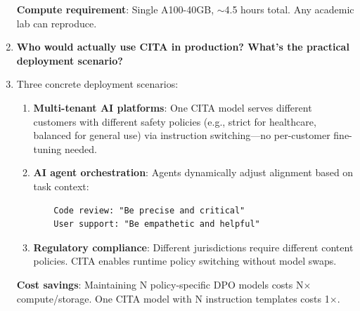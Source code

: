 \begin{enumerate}[label=\textbf{Q\arabic*.}, leftmargin=*, itemsep=8pt]
\textbf{Compute requirement}: Single A100-40GB, $\sim$4.5 hours total. Any academic lab can reproduce.

\vspace{4mm}

\item[\ding{93}] \textbf{Who would actually use CITA in production? What's the practical deployment scenario?}

\item[\ding{224}] Three concrete deployment scenarios:

\begin{enumerate}[leftmargin=*,itemsep=2pt]
    \item \textbf{Multi-tenant AI platforms}: One CITA model serves different customers with different safety policies (e.g., strict for healthcare, balanced for general use) via instruction switching---no per-customer fine-tuning needed.

    \item \textbf{AI agent orchestration}: Agents dynamically adjust alignment based on task context:
    \begin{verbatim}
    Code review: "Be precise and critical"
    User support: "Be empathetic and helpful"
    \end{verbatim}

    \item \textbf{Regulatory compliance}: Different jurisdictions require different content policies. CITA enables runtime policy switching without model swaps.
\end{enumerate}

\textbf{Cost savings}: Maintaining N policy-specific DPO models costs N$\times$ compute/storage. One CITA model with N instruction templates costs 1$\times$.

\end{enumerate}

\twocolumn
